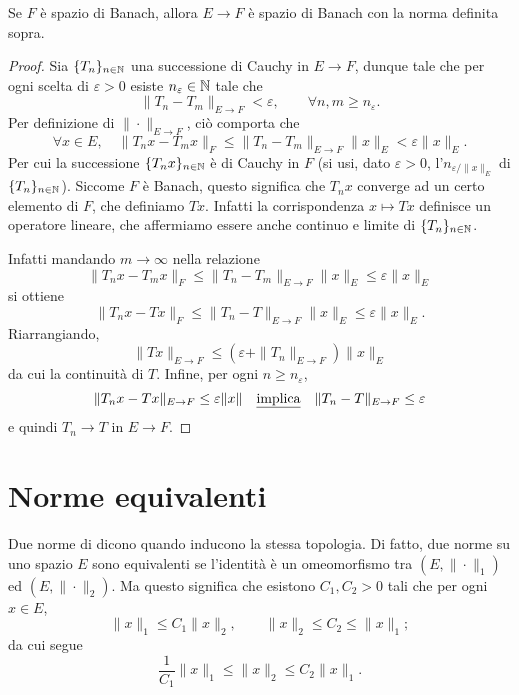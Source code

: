 \begin{lemma}
	Se $F$ è spazio di Banach, allora $E \to F$ è spazio di Banach con la norma definita sopra.
\end{lemma}
\begin{proof}
	Sia $\{T_n\}_{n \in \mathbb{N}}$ una successione di Cauchy in $E \to F$, dunque tale che per ogni scelta di $\varepsilon > 0$ esiste $n_\varepsilon \in \mathbb{N}$ tale che
	\begin{equation*}
		\|T_n - T_m\|_{E \to F} < \varepsilon, \qquad \forall n , m \geq n_\varepsilon.
	\end{equation*}
	Per definizione di $\|\cdot\|_{E \to F}$, ciò comporta che
	\begin{equation*}
		\forall x \in E, \quad \|T_nx - T_mx\|_F \leq \|T_n - T_m\|_{E \to F}\|x\|_E < \varepsilon\|x\|_E.
	\end{equation*}
	Per cui la successione $\{T_nx\}_{n \in \mathbb{N}}$ è di Cauchy in $F$ (si usi, dato $\varepsilon > 0$, l'$n_{\varepsilon/\|x\|_E}$ di $\{T_n\}_{n \in \mathbb{N}}$).
	Siccome $F$ è Banach, questo significa che $T_n x$ converge ad un certo elemento di $F$, che definiamo $Tx$. Infatti la corrispondenza $x \mapsto Tx$ definisce un operatore lineare, che affermiamo essere anche continuo e limite di $\{T_n\}_{n \in \mathbb{N}}$.

	Infatti mandando $m \to \infty$ nella relazione
	\begin{equation*}
		\|T_nx - T_m x \|_F \leq \|T_n - T_m\|_{E \to F}\|x\|_E \leq \varepsilon \|x\|_E
	\end{equation*}
	si ottiene
	\begin{equation*}
		\|T_n x - T x\|_F \leq \|T_n - T\|_{E \to F}\|x\|_E \leq \varepsilon \|x\|_E.
	\end{equation*}
	Riarrangiando,
	\begin{equation*}
		\|Tx\|_{E \to F} \leq (\varepsilon + \|T_n\|_{E \to F})\|x\|_E
	\end{equation*}
	da cui la continuità di $T$. Infine, per ogni $n \geq n_\varepsilon$,
	\begin{equation*}
		\|T_n x - Tx\|_{E \to F} \leq \varepsilon\|x\| \quad\text{\underline{implica}}\quad \|T_n - T\|_{E \to F} \leq \varepsilon
	\end{equation*}
	e quindi $T_n \to T$ in $E \to F$.
\end{proof}

\section{Norme equivalenti}
Due norme di dicono  quando inducono la stessa topologia. Di fatto, due norme su uno spazio $E$ sono equivalenti se l'identità è un omeomorfismo tra $(E, \|\cdot\|_1)$ ed $(E, \|\cdot\|_2)$. Ma questo significa che esistono $C_1, C_2 > 0$ tali che per ogni $x \in E$,
\begin{equation*}
	\|x\|_1 \leq C_1 \|x\|_2, \qquad \|x\|_2 \leq C_2 \leq \|x\|_1;
\end{equation*}
da cui segue
\begin{equation*}
	\frac1{C_1}\|x\|_1 \leq \|x\|_2 \leq C_2 \|x\|_1.
\end{equation*}

